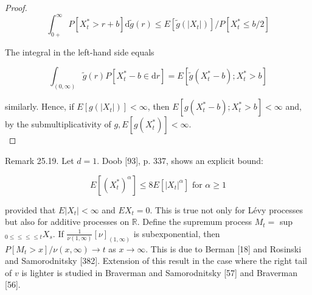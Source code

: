 \documentclass[a4paper,11pt]{article}
\begin{document}
\begin{proof}
    $$
        \int_{0+}^{\infty} P\left[X_{t}^{*}>r+b\right] \mathrm{d} \widetilde{g}(r) \leq E\left[\widetilde{g}\left(\left|X_{t}\right|\right)\right] / P\left[X_{t}^{*} \leq b / 2\right]
    $$

    The integral in the left-hand side equals

    $$
        \int_{(0, \infty)} \tilde{g}(r) P\left[X_{t}^{*}-b \in \mathrm{d} r\right]=E\left[\tilde{g}\left(X_{t}^{*}-b\right) ; X_{t}^{*}>b\right]
    $$

    similarly. Hence, if $E\left[g\left(\left|X_{t}\right|\right)\right]<\infty$,
    then $E\left[g\left(X_{t}^{*}-b\right) ; X_{t}^{*}>b\right]<\infty$ and,
    by the submultiplicativity of $g, E\left[g\left(X_{t}^{*}\right)\right]<\infty$. \\

\end{proof}


Remark 25.19. Let $d=1$. Doob [93], p. 337, shows an explicit bound:

\begin{equation*}
    E\left[\left(X_{t}^{*}\right)^{\alpha}\right] \leq 8 E\left[\left|X_{t}\right|^{\alpha}\right] \text { for } \alpha \geq 1 \tag{25.16}
\end{equation*}


provided that $E\left|X_{t}\right|<\infty$ and $E X_{t}=0$. This is true not only for Lévy processes but also
for additive processes on $\mathbb{R}$. Define the supremum process $M_{t}=$ sup $_{0 \leq \leq \leq \leq t} X_{s}$.
If $\frac{1}{\nu(1, \infty)}[\nu]_{(1, \infty)}$ is subexponential,
then $P\left[M_{t}>x\right] / \nu(x, \infty) \rightarrow t$ as $x \rightarrow \infty$.
This is due to Berman [18] and Rosinski and Samorodnitsky [382]. Extension of this result in the case
where the right tail of $v$ is lighter is studied in Braverman and Samorodnitsky [57] and Braverman [56].
\end{document}
